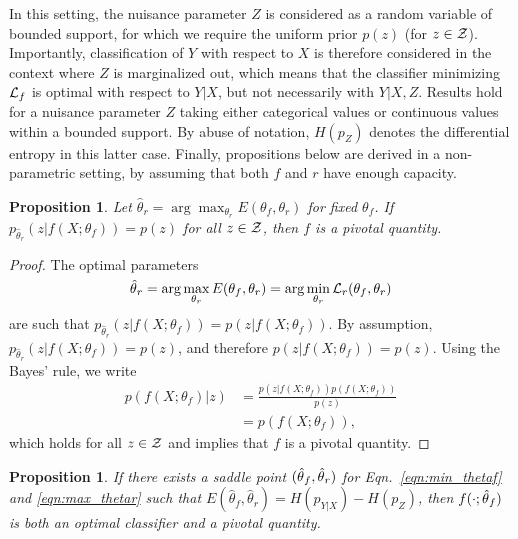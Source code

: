 \documentclass[twocolumn,superscriptaddress,aps]{revtex4-1}
\theoremstyle{plain}
\newtheorem{proposition}[theorem]{Proposition}
\begin{document}
In this setting, the nuisance parameter $Z$ is considered as a random variable
of bounded support, for which we require the uniform prior $p(z)$ (for $z \in
{\cal Z}$). Importantly, classification of $Y$ with respect to $X$ is therefore
considered in the context where $Z$ is marginalized out, which means that the
classifier minimizing ${\cal L}_f$ is optimal with respect to $Y|X$, but not
necessarily with $Y|X,Z$. Results hold for a nuisance parameter $Z$ taking
either categorical values or continuous values within a bounded support. By
abuse of notation, $H(p_Z)$ denotes the differential entropy in this latter
case. Finally, propositions below are derived in a non-parametric setting, by
assuming that both $f$ and $r$ have enough capacity.

\begin{proposition}\label{prop:1}
Let $\hat\theta_r = \arg \max_{\theta_r} E(\theta_f,
\theta_r)$ for fixed $\theta_f$. If $p_{\hat\theta_r}(z|f(X;\theta_f)) = p(z)$
for all $z \in {\cal Z}$, then $f$ is a pivotal quantity.
\end{proposition}

\begin{proof}
The optimal parameters $$\smash{\hat\theta}_r =
\arg \max_{\theta_r} E(\theta_f, \theta_r) = \arg \min_{\theta_r} {\cal L}_r(\theta_f,
\theta_r)$$ are such that $p_{\hat\theta_r}(z|f(X;\theta_f)) = p(z|f(X;\theta_f))$.
By assumption, $p_{\hat\theta_r}(z|f(X;\theta_f)) = p(z)$,
and therefore $p(z|f(X;\theta_f)) = p(z)$.
Using the Bayes' rule, we write
\begin{align*}
    p(f(X;\theta_f)|z) &= \frac{ p(z|f(X;\theta_f)) p(f(X;\theta_f)) } { p(z)}\\
                       &= p(f(X;\theta_f)),
\end{align*}
which holds for all $z \in {\cal Z}$ and implies that $f$ is a pivotal quantity.
\end{proof}

\begin{proposition}\label{prop:2}
If there exists a saddle point $(\smash{\hat\theta}_f, \smash{\hat\theta}_r)$
for Eqn.~\ref{eqn:min_thetaf} and \ref{eqn:max_thetar} such that
$E(\hat\theta_f, \hat\theta_r) = H(p_{Y|X}) - H(p_Z)$, then
$f(\cdot;\smash{\hat\theta}_f)$ is both an optimal classifier and a pivotal
quantity.
\end{proposition}
\end{document}
